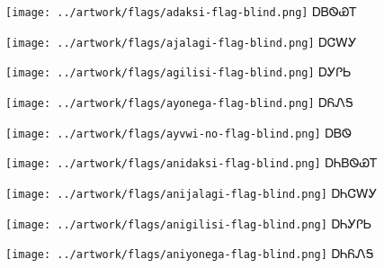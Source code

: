 \documentclass[avery5371,frame]{flashcards}%
\begin{document}

\begin{flashcard}{
\texttt{[image: ../artwork/flags/adaksi-flag-blind.png]}
}\Huge ᎠᏴᏫᏯᎢ
\end{flashcard}

\begin{flashcard}{
\texttt{[image: ../artwork/flags/ajalagi-flag-blind.png]}
}\Huge ᎠᏣᎳᎩ
\end{flashcard}

\begin{flashcard}{
\texttt{[image: ../artwork/flags/agilisi-flag-blind.png]}
}\Huge ᎠᎩᎵᏏ
\end{flashcard}

\begin{flashcard}{
\texttt{[image: ../artwork/flags/ayonega-flag-blind.png]}
}\Huge ᎠᏲᏁᎦ
\end{flashcard}

\begin{flashcard}{
\texttt{[image: ../artwork/flags/ayvwi-no-flag-blind.png]}
}\Huge ᎠᏴᏫ
\end{flashcard}


\begin{flashcard}{
\texttt{[image: ../artwork/flags/anidaksi-flag-blind.png]}
}\Huge ᎠᏂᏴᏫᏯᎢ
\end{flashcard}

\begin{flashcard}{
\texttt{[image: ../artwork/flags/anijalagi-flag-blind.png]}
}\Huge ᎠᏂᏣᎳᎩ
\end{flashcard}

\begin{flashcard}{
\texttt{[image: ../artwork/flags/anigilisi-flag-blind.png]}
}\Huge ᎠᏂᎩᎵᏏ
\end{flashcard}

\begin{flashcard}{
\texttt{[image: ../artwork/flags/aniyonega-flag-blind.png]}
}\Huge ᎠᏂᏲᏁᎦ
\end{flashcard}
\end{document}
